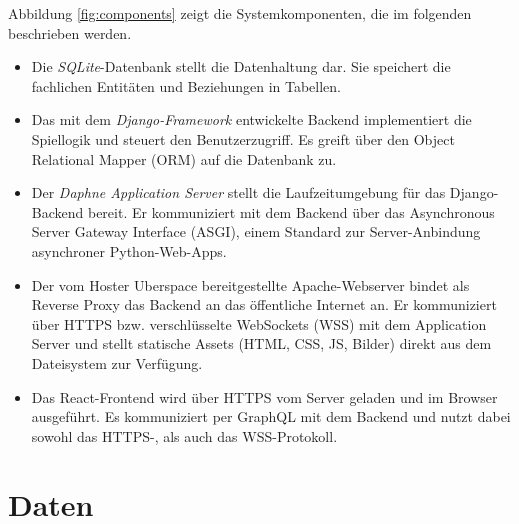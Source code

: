 \documentclass[a4paper,11pt,listof=numbered,glossary=totoc,parskip=half,toc=bib]{scrreprt}
\begin{document}
	Abbildung \ref{fig:components} zeigt die Systemkomponenten, die im folgenden beschrieben werden.
	
	\begin{itemize}
		\item Die \textit{SQLite}-Datenbank stellt die Datenhaltung dar. Sie speichert die fachlichen Entitäten und Beziehungen in Tabellen.
		\item Das mit dem \textit{Django-Framework} entwickelte Backend implementiert die Spiellogik und steuert den Benutzerzugriff. Es greift über den Object Relational Mapper (ORM) auf die Datenbank zu.
		\item Der \textit{Daphne Application Server} stellt die Laufzeitumgebung für das Django-Backend bereit. Er kommuniziert mit dem Backend über das Asynchronous Server Gateway Interface (ASGI), einem Standard zur Server-Anbindung asynchroner Python-Web-Apps.
		\item Der vom Hoster Uberspace bereitgestellte Apache-Webserver bindet als Reverse Proxy das Backend an das öffentliche Internet an. Er kommuniziert über HTTPS bzw. verschlüsselte WebSockets (WSS) mit dem Application Server und stellt statische Assets (HTML, CSS, JS, Bilder) direkt aus dem Dateisystem zur Verfügung.
		\item Das React-Frontend wird über HTTPS vom Server geladen und im Browser ausgeführt. Es kommuniziert per GraphQL mit dem Backend und nutzt dabei sowohl das HTTPS-, als auch das WSS-Protokoll.
	\end{itemize}
	
	
	\section{Daten}
	
\end{document}

